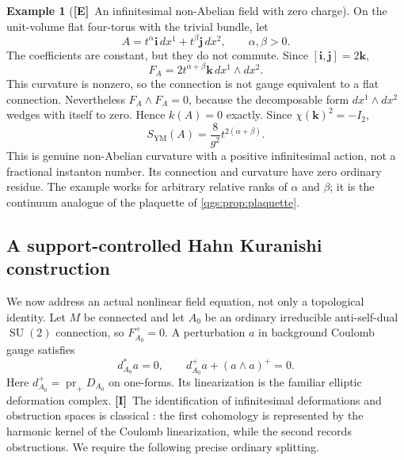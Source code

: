 \documentclass[11pt,oneside]{article}
\numberwithin{equation}{section}
\theoremstyle{plain}
\theoremstyle{definition}
\newtheorem{example}[example]{Example}
\theoremstyle{remark}
\newcommand{\qi}{\mathbf i}
\newcommand{\qj}{\mathbf j}
\newcommand{\qk}{\mathbf k}
\newcommand{\SYM}{S_{\mathrm{YM}}}
\DeclareMathOperator{\SU}{SU}
\newcommand{\TE}{\textcolor{TierE}{\textsf{\bfseries[E]}}}
\newcommand{\TI}{\textcolor{TierI}{\textsf{\bfseries[I]}}}
\begin{document}
\begin{example}[\TE\ An infinitesimal non-Abelian field with zero charge]\label{qgs:obs:ex:torus}
On the unit-volume flat four-torus with the trivial bundle, let
\begin{equation}
 A=t^\alpha \qi\,dx^1+t^\beta \qj\,dx^2,
 \qquad \alpha,\beta>0.
\end{equation}
The coefficients are constant, but they do not commute. Since $[\qi,\qj]=2\qk$,
\begin{equation}
 F_A=2t^{\alpha+\beta}\qk\,dx^1\wedge dx^2.
\end{equation}
This curvature is nonzero, so the connection is not gauge equivalent to a flat connection. Nevertheless $F_A\wedge F_A=0$, because the decomposable form $dx^1\wedge dx^2$ wedges with itself to zero. Hence $k(A)=0$ exactly. Since $\chi(\qk)^2=-I_2$,
\begin{equation}\label{qgs:obs:eq:torus-action}
 \SYM(A)=\frac8{g^2}t^{2(\alpha+\beta)}.
\end{equation}
This is genuine non-Abelian curvature with a positive infinitesimal action, not a fractional instanton number. Its connection and curvature have zero ordinary residue. The example works for arbitrary relative ranks of $\alpha$ and $\beta$; it is the continuum analogue of the plaquette of \cref{qgs:prop:plaquette}.
\end{example}

\subsection{A support-controlled Hahn Kuranishi construction}\label{qgs:obs:sec:kuranishi}
We now address an actual nonlinear field equation, not only a topological identity. Let $M$ be connected and let $A_0$ be an ordinary irreducible anti-self-dual $\SU(2)$ connection, so $F_{A_0}^+=0$. A perturbation $a$ in background Coulomb gauge satisfies
\begin{equation}\label{qgs:obs:eq:ASD}
 d_{A_0}^*a=0,
 \qquad d_{A_0}^+a+(a\wedge a)^+=0.
\end{equation}
Here $d_{A_0}^+=\operatorname{pr}_+D_{A_0}$ on one-forms. Its linearization is the familiar elliptic deformation complex. \TI\ The identification of infinitesimal deformations and obstruction spaces is classical \cite{AHS,Itoh}: the first cohomology is represented by the harmonic kernel of the Coulomb linearization, while the second records obstructions. We require the following precise ordinary splitting.
\end{document}
